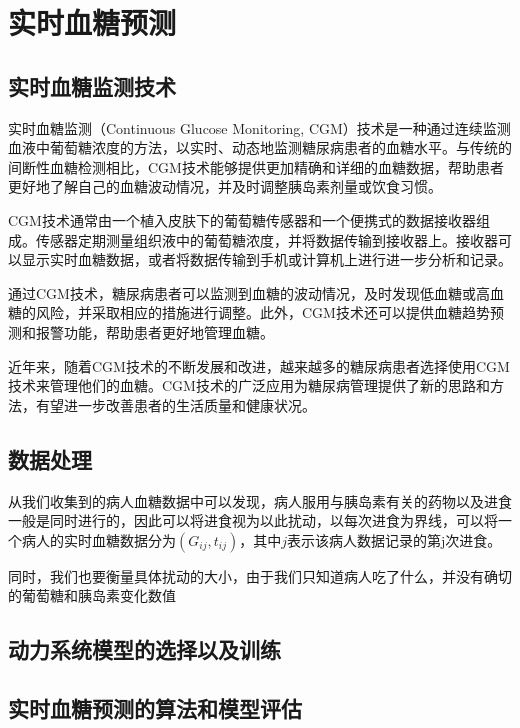 \chapter{实时血糖预测}\label{chap:predict}
\section{实时血糖监测技术}
实时血糖监测（Continuous Glucose Monitoring, CGM）技术是一种通过连续监测血液中葡萄糖浓度的方法，以实时、动态地监测糖尿病患者的血糖水平。与传统的间断性血糖检测相比，CGM技术能够提供更加精确和详细的血糖数据，帮助患者更好地了解自己的血糖波动情况，并及时调整胰岛素剂量或饮食习惯。

CGM技术通常由一个植入皮肤下的葡萄糖传感器和一个便携式的数据接收器组成。传感器定期测量组织液中的葡萄糖浓度，并将数据传输到接收器上。接收器可以显示实时血糖数据，或者将数据传输到手机或计算机上进行进一步分析和记录。

通过CGM技术，糖尿病患者可以监测到血糖的波动情况，及时发现低血糖或高血糖的风险，并采取相应的措施进行调整。此外，CGM技术还可以提供血糖趋势预测和报警功能，帮助患者更好地管理血糖\cite{vigersky2017role}。

近年来，随着CGM技术的不断发展和改进，越来越多的糖尿病患者选择使用CGM技术来管理他们的血糖。CGM技术的广泛应用为糖尿病管理提供了新的思路和方法，有望进一步改善患者的生活质量和健康状况。
\section{数据处理}
从我们收集到的病人血糖数据中可以发现，病人服用与胰岛素有关的药物以及进食一般是同时进行的，因此可以将进食视为以此扰动，以每次进食为界线，可以将一个病人的实时血糖数据分为$(G_{ij}, t_{ij})$，其中$j$表示该病人数据记录的第j次进食。

同时，我们也要衡量具体扰动的大小，由于我们只知道病人吃了什么，并没有确切的葡萄糖和胰岛素变化数值
\section{动力系统模型的选择以及训练}
\section{实时血糖预测的算法和模型评估}